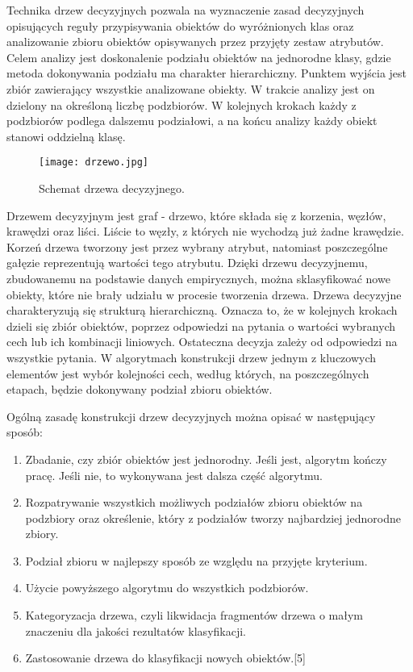 \documentclass{article}
\begin{document}
 Technika drzew decyzyjnych pozwala na wyznaczenie zasad decyzyjnych opisujących reguły przypisywania obiektów do wyróżnionych klas oraz analizowanie zbioru obiektów opisywanych przez przyjęty zestaw atrybutów. Celem analizy jest doskonalenie podziału obiektów na jednorodne klasy, gdzie metoda dokonywania podziału ma charakter hierarchiczny. Punktem wyjścia jest zbiór zawierający wszystkie analizowane obiekty. W trakcie analizy jest on dzielony na określoną liczbę podzbiorów. W kolejnych krokach każdy z podzbiorów podlega dalszemu podziałowi, a na końcu analizy każdy obiekt stanowi oddzielną klasę.
 
 \begin{figure}[ht]
    \centering
    \noindent 
    \vspace{.2cm}
    \texttt{[image: drzewo.jpg]}
    \caption{Schemat drzewa decyzyjnego.}
    \label{fig:drzewo}
\end{figure}
 
 Drzewem decyzyjnym jest graf - drzewo, które składa się z korzenia, węzłów, krawędzi oraz liści. Liście to węzły, z których nie wychodzą już żadne krawędzie. Korzeń drzewa tworzony jest przez wybrany atrybut, natomiast poszczególne gałęzie reprezentują wartości tego atrybutu. Dzięki drzewu decyzyjnemu, zbudowanemu na podstawie danych empirycznych, można sklasyfikować nowe obiekty, które nie brały udziału w procesie tworzenia drzewa. Drzewa decyzyjne charakteryzują się strukturą hierarchiczną. Oznacza to, że w kolejnych krokach dzieli się zbiór obiektów, poprzez odpowiedzi na pytania o wartości wybranych cech lub ich kombinacji liniowych. Ostateczna decyzja zależy od odpowiedzi na wszystkie pytania. W algorytmach konstrukcji drzew jednym z kluczowych elementów jest wybór kolejności cech, według których, na poszczególnych etapach, będzie dokonywany podział zbioru obiektów.
 
 Ogólną zasadę konstrukcji drzew decyzyjnych można opisać w następujący sposób:
\begin{enumerate}
    \item Zbadanie, czy zbiór obiektów jest jednorodny. Jeśli jest, algorytm kończy pracę. Jeśli nie, to wykonywana jest dalsza część algorytmu.
    \item Rozpatrywanie wszystkich możliwych podziałów zbioru obiektów na podzbiory oraz określenie, który z podziałów tworzy najbardziej jednorodne zbiory.
    \item Podział zbioru w najlepszy sposób ze względu na przyjęte kryterium.
    \item Użycie powyższego algorytmu do wszystkich podzbiorów.
    \item Kategoryzacja drzewa, czyli likwidacja fragmentów drzewa o małym znaczeniu dla jakości rezultatów klasyfikacji.
    \item Zastosowanie drzewa do klasyfikacji nowych obiektów.[5]\\\\
\end{enumerate}{}
\newpage
\end{document}
